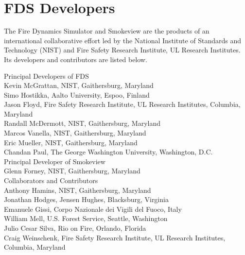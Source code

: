 \chapter{FDS Developers}

The Fire Dynamics Simulator and Smokeview are the products of an international collaborative effort led by
the National Institute of Standards and Technology (NIST) and Fire Safety Research Institute, UL Research Institutes. Its developers and
contributors are listed below.

\vspace{0.3in}

\begin{flushleft}

Principal Developers of FDS  \\ [0.2in]

Kevin McGrattan, NIST, Gaithersburg, Maryland \\
Simo Hostikka, Aalto University, Espoo, Finland \\
Jason Floyd, Fire Safety Research Institute, UL Research Institutes, Columbia, Maryland \\
Randall McDermott, NIST, Gaithersburg, Maryland \\
Marcos Vanella, NIST, Gaithersburg, Maryland \\
Eric Mueller, NIST, Gaithersburg, Maryland \\
Chandan Paul, The George Washington University, Washington, D.C. \\ [0.3in]

Principal Developer of Smokeview  \\ [0.2in]

Glenn Forney, NIST, Gaithersburg, Maryland \\ [0.3in]

Collaborators and Contributors \\ [0.2in]

Anthony Hamins, NIST, Gaithersburg, Maryland \\
Jonathan Hodges, Jensen Hughes, Blacksburg, Virginia \\
Emanuele Gissi, Corpo Nazionale dei Vigili del Fuoco, Italy \\
William Mell, U.S. Forest Service, Seattle, Washington \\
Julio Cesar Silva, Rio on Fire, Orlando, Florida  \\
Craig Weinschenk, Fire Safety Research Institute, UL Research Institutes, Columbia, Maryland

\end{flushleft}

